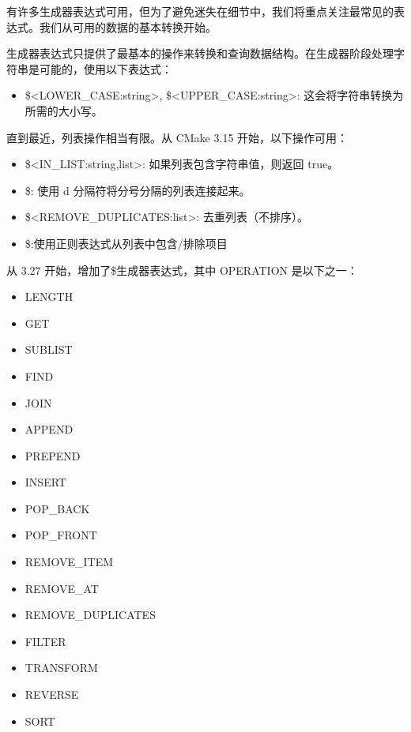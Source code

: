 
有许多生成器表达式可用，但为了避免迷失在细节中，我们将重点关注最常见的表达式。我们从可用的数据的基本转换开始。


生成器表达式只提供了最基本的操作来转换和查询数据结构。在生成器阶段处理字符串是可能的，使用以下表达式：

\begin{itemize}
\item
\$<LOWER\_CASE:string>, \$<UPPER\_CASE:string>: 这会将字符串转换为所需的大小写。
\end{itemize}

直到最近，列表操作相当有限。从 CMake 3.15 开始，以下操作可用：

\begin{itemize}
\item
\$<IN\_LIST:string,list>: 如果列表包含字符串值，则返回 true。

\item
\$<JOIN:list,d>: 使用 d 分隔符将分号分隔的列表连接起来。

\item
\$<REMOVE\_DUPLICATES:list>: 去重列表（不排序）。

\item
\$<FILTER:list,INCLUDE|EXCLUDE,regex>:使用正则表达式从列表中包含/排除项目
\end{itemize}

从 3.27 开始，增加了\$<LIST:OPERATION>生成器表达式，其中 OPERATION 是以下之一：

\begin{itemize}
\item
LENGTH

\item
GET

\item
SUBLIST

\item
FIND

\item
JOIN

\item
APPEND

\item
PREPEND

\item
INSERT

\item
POP\_BACK

\item
POP\_FRONT

\item
REMOVE\_ITEM

\item
REMOVE\_AT

\item
REMOVE\_DUPLICATES

\item
FILTER

\item
TRANSFORM

\item
REVERSE

\item
SORT
\end{itemize}

